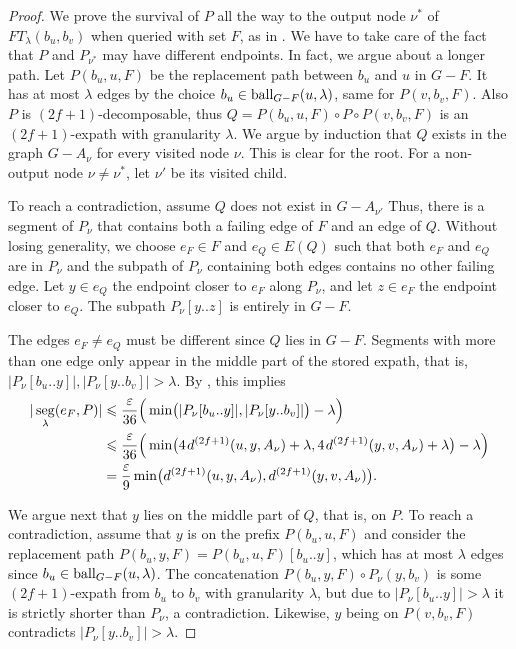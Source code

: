 \documentclass{article}\usepackage[a4paper,margin=20mm]{geometry}
\DeclareMathOperator{\seg}{seg}
\newcommand*{\length}[1]{|#1|}
\newcommand*{\ball}{\mbox{\rm ball}}
\newcommand*{\nwspace}{\hspace*{.1em}}
\renewcommand{\le}{\leqslant}
\newcommand{\eps}{\varepsilon}
\begin{document}
\begin{proof}
We prove the survival of $P$ all the way to the output node $\nu^*$ of $FT_{\lambda}(b_u,b_v)$
when queried with set $F$, as in .
We have to take care of the fact that $P$ and $P_{\nu^*}$
may have different endpoints.
In fact, we argue about a longer path.
Let $P(b_u,u,F)$ be the replacement path between $b_u$ and $u$ in $G{-}F$.
It has at most $\lambda$ edges by the choice $b_u \in \ball_{G-F}(u,\lambda)$,
same for $P(v,b_v,F)$.
Also $P$ is $(2f{+}1)$-decomposable, thus $Q = P(b_u,u,F) \circ P \circ  P(v,b_v,F)$
is an $(2f{+}1)$-expath with granularity $\lambda$.
We argue by induction that $Q$ exists in the graph $G{-}A_{\nu}$ for every visited node $\nu$.
This is clear for the root.
For a non-output node $\nu \neq \nu^*$, let $\nu'$ be its visited child.

To reach a contradiction, assume $Q$ does not exist in $G-A_{\nu'}$
Thus, there is a segment of
$P_{\nu}$ that contains both a failing edge of $F$ and an edge of $Q$.
Without losing generality,
we choose $e_F \in F$ and $e_Q \in E(Q)$ such that both $e_F$ and $e_Q$ are in $P_\nu$
and the subpath of $P_\nu$ containing both edges contains no other failing edge.
Let $y \in e_Q$ the endpoint closer to $e_F$ along $P_\nu$,
and let $z \in e_F$ the endpoint closer to $e_Q$. 
The subpath $P_\nu[y..z]$ is entirely in $G-F$.

The edges $e_F \ne e_Q$ must be different since $Q$ lies in $G{-}F$.
Segments with more than one edge only appear in the middle part of the stored expath, that is,
$\length{P_\nu[b_u..y]},\length{P_\nu[y..b_v]} > \lambda$.
By , this implies
\begin{align*}
	\length{\seg_{\lambda}(e_F,P)}  
  		&\le \frac{\eps}{36} \Big(\min\!\big(\length{P_\nu[b_u..y]}, \length{P_\nu[y..b_v]} \big) - \lambda \Big)\\
  		&\le \frac{\eps}{36} \Big(\min\!\big(4 \nwspace d^{(2f+1)}(u,y,A_{\nu})+\lambda,
  			4 \nwspace d^{(2f+1)}(y,v,A_{\nu}) + \lambda \big) - \lambda \Big)\\
  		&= \frac{\varepsilon}{9} \min\!\big(d^{(2f+1)}(u,y,A_{\nu}), d^{(2f+1)}(y,v,A_{\nu})\big).
\end{align*}

We argue next that $y$ lies on the middle part of $Q$, that is, on $P$.
To reach a contradiction, assume that $y$ is on the prefix $P(b_u,u,F)$
and consider the replacement path $P(b_u,y,F) = P(b_u,u,F)[b_u..y]$,
which has at most $\lambda$ edges since $b_u \in \ball_{G-F}(u,\lambda)$.
The concatenation $P(b_u,y,F) \circ P_\nu(y,b_v)$ is some $(2f{+}1)$-expath from
$b_u$ to $b_v$ with granularity $\lambda$,
but due to $|P_\nu[b_u..y]| > \lambda$ it is strictly shorter than $P_\nu$, a contradiction.
Likewise, $y$ being on $P(v,b_v,F)$ contradicts $|P_{\nu}[y..b_v]| > \lambda$.


\end{proof}
\end{document}
